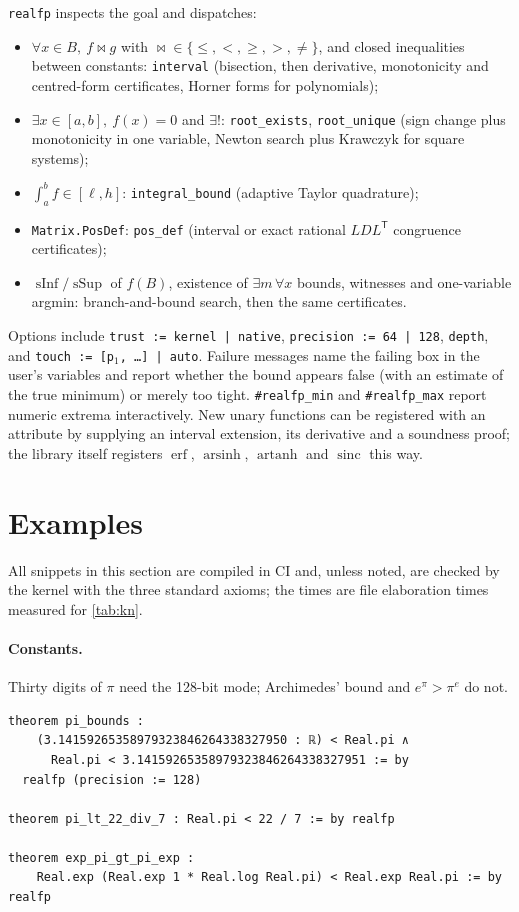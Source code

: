 \documentclass[11pt]{article}
\theoremstyle{definition}
\theoremstyle{remark}
\newcommand{\lean}[1]{\texttt{#1}}
\begin{document}
\lean{realfp} inspects the goal and dispatches:
\begin{itemize}[nosep]
\item $\forall x\in B,\ f\bowtie g$ with ${\bowtie}\in\{\le,<,\ge,>,\ne\}$, and
  closed inequalities between constants: \lean{interval} (bisection, then
  derivative, monotonicity and centred-form certificates, Horner forms for
  polynomials);
\item $\exists x\in[a,b],\ f(x)=0$ and $\exists!$: \lean{root\_exists},
  \lean{root\_unique} (sign change plus monotonicity in one variable,
  Newton search plus Krawczyk for square systems);
\item $\int_a^b f\in[\ell,h]$: \lean{integral\_bound} (adaptive Taylor
  quadrature);
\item \lean{Matrix.PosDef}: \lean{pos\_def} (interval or exact rational
  $LDL^{\mathsf T}$ congruence certificates);
\item $\operatorname{sInf}/\operatorname{sSup}$ of $f(B)$, existence of
  $\exists m\,\forall x$ bounds, witnesses and one-variable argmin:
  branch-and-bound search, then the same certificates.
\end{itemize}
Options include \lean{trust := kernel | native}, \lean{precision := 64 | 128},
\lean{depth}, and \lean{touch := [p$_1$, \dots] | auto}. Failure messages name
the failing box in the user's variables and report whether the bound appears
false (with an estimate of the true minimum) or merely too tight.
\lean{\#realfp\_min} and \lean{\#realfp\_max} report numeric extrema
interactively. New unary functions can be registered with an attribute by
supplying an interval extension, its derivative and a soundness proof; the
library itself registers $\operatorname{erf}$, $\operatorname{arsinh}$,
$\operatorname{artanh}$ and $\operatorname{sinc}$ this way.

\section{Examples}\label{sec:examples}

All snippets in this section are compiled in CI and, unless noted, are
checked by the kernel with the three standard axioms; the times are file
elaboration times measured for \cref{tab:kn}.

\paragraph{Constants.} Thirty digits of $\pi$ need the 128-bit mode;
Archimedes' bound and $e^\pi>\pi^e$ do not.
\begin{lstlisting}
theorem pi_bounds :
    (3.14159265358979323846264338327950 : ℝ) < Real.pi ∧
      Real.pi < 3.14159265358979323846264338327951 := by
  realfp (precision := 128)

theorem pi_lt_22_div_7 : Real.pi < 22 / 7 := by realfp

theorem exp_pi_gt_pi_exp :
    Real.exp (Real.exp 1 * Real.log Real.pi) < Real.exp Real.pi := by realfp
\end{lstlisting}
\end{document}
